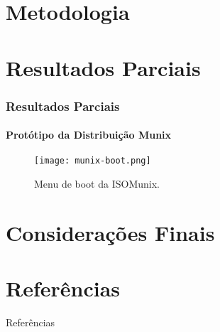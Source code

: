 \documentclass[aspectratio=43]{beamer}
\begin{document}
\section{Metodologia}

\section{Resultados Parciais}

\begin{frame}
    \frametitle{Resultados Parciais}
    \framesubtitle{Protótipo da Distribuição Munix}

    \begin{figure}[H]
        \caption{\label{fig:boot-munix}Menu de boot da ISO\@ Munix.}
        \begin{center}
            \texttt{[image: munix-boot.png]}
        \end{center}
    \end{figure}

\end{frame}

\section{Considerações Finais}


\section{Referências}


\begin{frame}[allowframebreaks]{Referências}

\end{frame}

\end{document}
